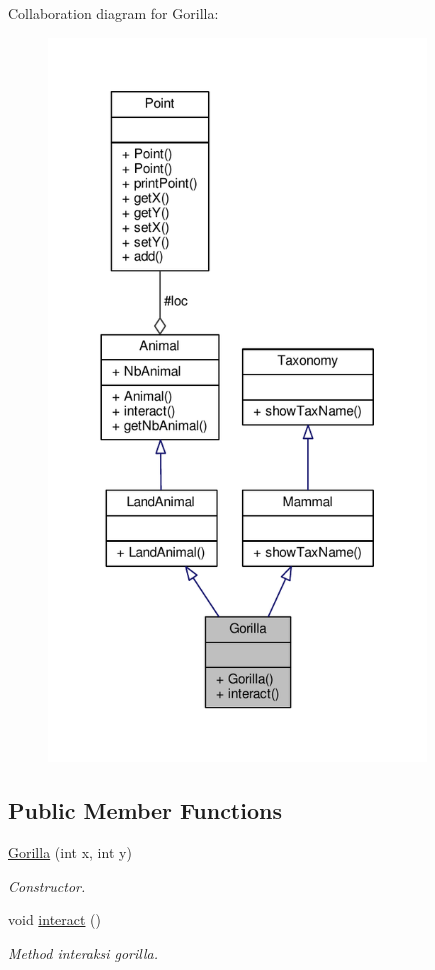 Collaboration diagram for Gorilla\+:
\nopagebreak
\begin{figure}[H]
\begin{center}
\leavevmode
\includegraphics[width=284pt]{classGorilla__coll__graph}
\end{center}
\end{figure}
\subsection*{Public Member Functions}
\begin{DoxyCompactItemize}
\item 
\hyperlink{classGorilla_addacb24475b69251ffab52377adb63fe}{Gorilla} (int x, int y)
\begin{DoxyCompactList}\small\item\em Constructor. \end{DoxyCompactList}\item 
void \hyperlink{classGorilla_ac0b08bebf807544f8821818986b26386}{interact} ()\hypertarget{classGorilla_ac0b08bebf807544f8821818986b26386}{}\label{classGorilla_ac0b08bebf807544f8821818986b26386}

\begin{DoxyCompactList}\small\item\em Method interaksi gorilla. \end{DoxyCompactList}\end{DoxyCompactItemize}
